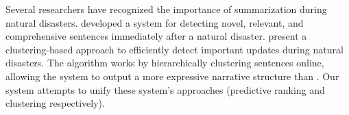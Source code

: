 Several researchers have recognized the importance of summarization during
natural disasters.  \cite{qi:temporal-summarization} developed a system for detecting
novel, relevant, and comprehensive sentences immediately after a natural
disaster.  
\cite{wang:update-summarization} present a clustering-based approach to
efficiently detect important updates during natural disasters.  
The algorithm works by hierarchically
clustering sentences online, allowing the system to output a more expressive
narrative structure than \cite{qi:temporal-summarization}.  
Our system attempts to unify these system's approaches 
(predictive ranking and clustering respectively). 



